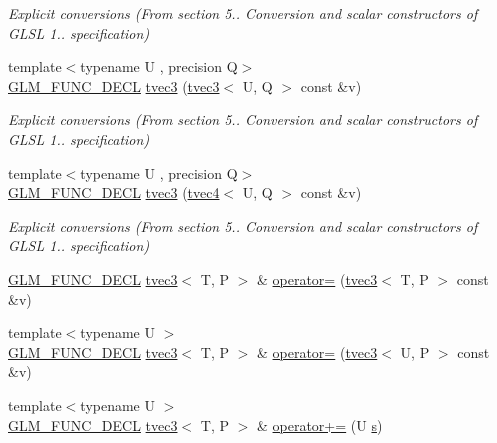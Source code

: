 \begin{DoxyCompactItemize}
\begin{DoxyCompactList}\small\item\em Explicit conversions (From section 5.. Conversion and scalar constructors of G\+L\+SL 1.. specification) \end{DoxyCompactList}\item 
{\footnotesize template$<$typename U , precision Q$>$ }\\\hyperlink{setup_8hpp_ab2d052de21a70539923e9bcbf6e83a51}{G\+L\+M\+\_\+\+F\+U\+N\+C\+\_\+\+D\+E\+CL} \hyperlink{structglm_1_1detail_1_1tvec3_a54b078bacee2ec2449d2739d98f20ca4}{tvec3} (\hyperlink{structglm_1_1detail_1_1tvec3}{tvec3}$<$ U, Q $>$ const \&v)
\begin{DoxyCompactList}\small\item\em Explicit conversions (From section 5.. Conversion and scalar constructors of G\+L\+SL 1.. specification) \end{DoxyCompactList}\item 
{\footnotesize template$<$typename U , precision Q$>$ }\\\hyperlink{setup_8hpp_ab2d052de21a70539923e9bcbf6e83a51}{G\+L\+M\+\_\+\+F\+U\+N\+C\+\_\+\+D\+E\+CL} \hyperlink{structglm_1_1detail_1_1tvec3_aee034f5d37843761ab03ce2c279a0435}{tvec3} (\hyperlink{structglm_1_1detail_1_1tvec4}{tvec4}$<$ U, Q $>$ const \&v)
\begin{DoxyCompactList}\small\item\em Explicit conversions (From section 5.. Conversion and scalar constructors of G\+L\+SL 1.. specification) \end{DoxyCompactList}\item 
\hyperlink{setup_8hpp_ab2d052de21a70539923e9bcbf6e83a51}{G\+L\+M\+\_\+\+F\+U\+N\+C\+\_\+\+D\+E\+CL} \hyperlink{structglm_1_1detail_1_1tvec3}{tvec3}$<$ T, P $>$ \& \hyperlink{structglm_1_1detail_1_1tvec3_a9f44bd2cac6579b51eab334829af1421}{operator=} (\hyperlink{structglm_1_1detail_1_1tvec3}{tvec3}$<$ T, P $>$ const \&v)
\item 
{\footnotesize template$<$typename U $>$ }\\\hyperlink{setup_8hpp_ab2d052de21a70539923e9bcbf6e83a51}{G\+L\+M\+\_\+\+F\+U\+N\+C\+\_\+\+D\+E\+CL} \hyperlink{structglm_1_1detail_1_1tvec3}{tvec3}$<$ T, P $>$ \& \hyperlink{structglm_1_1detail_1_1tvec3_aa930edd4c5010f088ff8bf10d3a50378}{operator=} (\hyperlink{structglm_1_1detail_1_1tvec3}{tvec3}$<$ U, P $>$ const \&v)
\item 
{\footnotesize template$<$typename U $>$ }\\\hyperlink{setup_8hpp_ab2d052de21a70539923e9bcbf6e83a51}{G\+L\+M\+\_\+\+F\+U\+N\+C\+\_\+\+D\+E\+CL} \hyperlink{structglm_1_1detail_1_1tvec3}{tvec3}$<$ T, P $>$ \& \hyperlink{structglm_1_1detail_1_1tvec3_a1c2a116b686e23bab8fae7780950ef38}{operator+=} (U \hyperlink{structglm_1_1detail_1_1tvec3_aa7906d8cd1a54c96ba22c1f97ebaf7cc}{s})

\end{DoxyCompactItemize}
